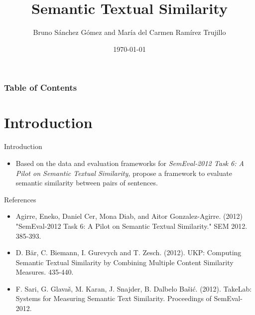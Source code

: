 \documentclass{beamer}
\title{Semantic Textual Similarity}
\author{Bruno Sánchez Gómez and María del Carmen Ramírez Trujillo}
\date{\today}
\begin{document}
\begin{frame}
    \titlepage
\end{frame}

\begin{frame}
    \frametitle{Table of Contents}
    \tableofcontents
\end{frame}

\section{Introduction}
\frame{\tableofcontents[currentsection]}
\begin{frame}{Introduction}
    \begin{itemize}
        \item {\large Based on the data and evaluation frameworks for \textit{SemEval-2012 Task 6: A Pilot on Semantic Textual
         Similarity,} propose a framework to evaluate semantic similarity between pairs of sentences.}
    \end{itemize}
\end{frame}



\begin{frame}{References}
    \begin{itemize}
        \item Agirre, Eneko, Daniel Cer, Mona Diab, and Aitor Gonzalez-Agirre. (2012) "SemEval-2012 Task 6: A Pilot on Semantic Textual Similarity." SEM 2012. 385-393. 
        \item D. Bär, C. Biemann, I. Gurevych and T. Zesch. (2012). UKP: Computing Semantic Textual Similarity by Combining Multiple Content Similarity Measures. 435-440. 
        \item F. Sari, G. Glavaš, M. Karan, J. Snajder, B. Dalbelo Bašić. (2012). TakeLab: Systems for Measuring Semantic Text Similarity. Proceedings of SemEval-2012. 
    \end{itemize}    
\end{frame}
\end{document}
